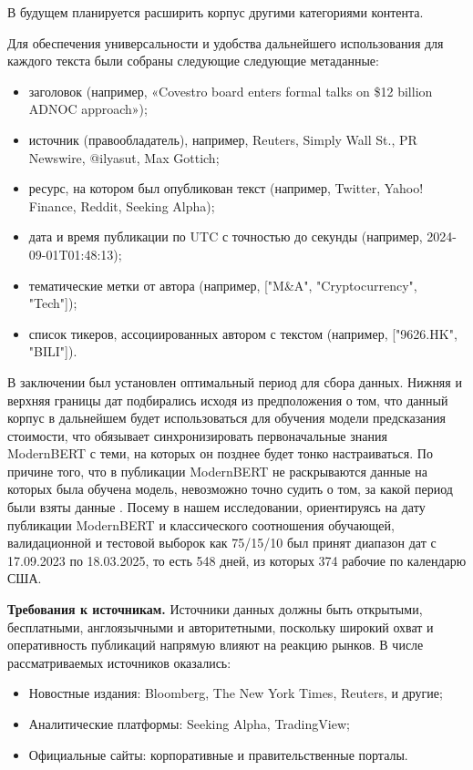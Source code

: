 В будущем планируется расширить корпус другими категориями контента.

Для обеспечения универсальности и удобства дальнейшего использования для каждого текста были собраны следующие следующие метаданные:

\begin{itemize}
    \item заголовок (например, «Covestro board enters formal talks on \$12 billion ADNOC approach»);
    \item источник (правообладатель), например, Reuters, Simply Wall St., PR Newswire, @ilyasut, Max Gottich;
    \item ресурс, на котором был опубликован текст (например, Twitter, Yahoo! Finance, Reddit, Seeking Alpha);
    \item дата и время публикации по UTC с точностью до секунды (например, 2024-09-01T01:48:13);
    \item тематические метки от автора (например, ["M\&A", "Cryptocurrency", "Tech"]);
    \item список тикеров, ассоциированных автором с текстом (например, ["9626.HK", "BILI"]).
\end{itemize}

В заключении был установлен оптимальный период для сбора данных. Нижняя и верхняя границы дат подбирались
исходя из предположения о том, что данный корпус в дальнейшем будет использоваться для обучения модели предсказания
стоимости, что обязывает синхронизировать первоначальные знания ModernBERT с теми, на которых он позднее будет
тонко настраиваться. По причине того, что в публикации ModernBERT не раскрываются данные на которых была обучена
модель, невозможно точно судить о том, за какой период были взяты данные \parencite{Warner2024ModernBERT}. Посему в нашем исследовании, ориентируясь
на дату публикации ModernBERT \parencite{Warner2024ModernBERT} и классического соотношения обучающей, валидационной и тестовой выборок как 75/15/10
был принят диапазон дат с 17.09.2023 по 18.03.2025, то есть 548 дней, из которых 374 рабочие по календарю США.

\textbf{Требования к источникам.} Источники данных должны быть открытыми, бесплатными, англоязычными и авторитетными,
поскольку широкий охват и оперативность публикаций напрямую влияют на реакцию рынков. В числе рассматриваемых
источников оказались:

\begin{itemize}
    \item Новостные издания: Bloomberg, The New York Times, Reuters, и другие;
    \item Аналитические платформы: Seeking Alpha, TradingView;
    \item Официальные сайты: корпоративные и правительственные порталы.
\end{itemize}

